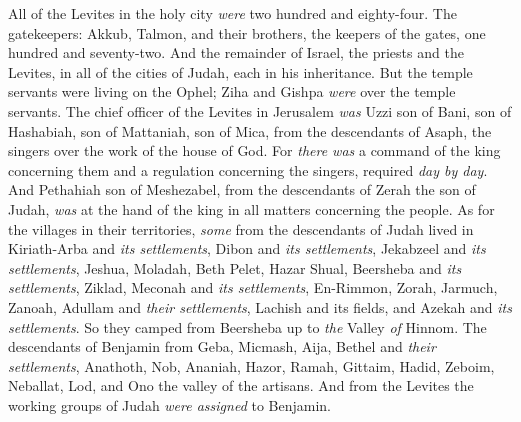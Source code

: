 \begin{biblechapter}
\verse All of the Levites in the holy city \textit{were} two hundred and eighty-four.
\verse The gatekeepers: Akkub, Talmon, and their brothers, the keepers of the gates, one hundred and seventy-two.
\verse And the remainder of Israel, the priests and the Levites, in all of the cities of Judah, each in his inheritance.
\verse But the temple servants were living on the Ophel; Ziha and Gishpa \textit{were} over the temple servants.
\verse The chief officer of the Levites in Jerusalem \textit{was} Uzzi son of Bani, son of Hashabiah, son of Mattaniah, son of Mica, from the descendants of Asaph, the singers over the work of the house of God.
\verse For \textit{there was} a command of the king concerning them and a regulation concerning the singers, required \textit{day by day}.
\verse And Pethahiah son of Meshezabel, from the descendants of Zerah the son of Judah, \textit{was} at the hand of the king in all matters concerning the people.
 As for the villages in their territories, \textit{some} from the descendants of Judah lived in Kiriath-Arba and \textit{its settlements}, Dibon and \textit{its settlements}, Jekabzeel and \textit{its settlements},
\verse Jeshua, Moladah, Beth Pelet,
\verse Hazar Shual, Beersheba and \textit{its settlements},
\verse Ziklad, Meconah and \textit{its settlements},
\verse En-Rimmon, Zorah, Jarmuch,
\verse Zanoah, Adullam and \textit{their settlements}, Lachish and its fields, and Azekah and \textit{its settlements}. So they camped from Beersheba up to \textit{the} Valley \textit{of} Hinnom.
\verse The descendants of Benjamin from Geba, Micmash, Aija, Bethel and \textit{their settlements},
\verse Anathoth, Nob, Ananiah,
\verse Hazor, Ramah, Gittaim,
\verse Hadid, Zeboim, Neballat,
\verse Lod, and Ono the valley of the artisans.
\verse And from the Levites the working groups of Judah \textit{were assigned} to Benjamin.
\end{biblechapter}

